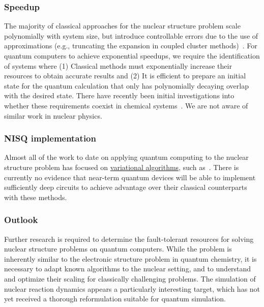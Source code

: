 \begin{refsection}

\subsubsection*{Speedup}
The majority of classical approaches for the nuclear structure problem scale polynomially with system size, but introduce controllable errors due to the use of approximations (e.g., truncating the expansion in coupled cluster methods)~\cite{hergert2020AbInitioNuclear}. For quantum computers to achieve exponential speedups, we require the identification of systems where (1) Classical methods must exponentially increase their resources to obtain accurate results and (2) It is efficient to prepare an initial state for the quantum calculation that only has polynomially decaying overlap with the desired state. There have recently been initial investigations into whether these requirements coexist in chemical systems~\cite{lee2022isThereEvidenceChemistry}. We are not aware of similar work in nuclear physics.



\subsubsection*{NISQ implementation}
Almost all of the work to date on applying quantum computing to the nuclear structure problem has focused on \hyperref[prim:VQA]{variational algorithms}, such as~\cite{dumitrescu2018CloudNucleus,lu2019NuclearQuantumFrequency,stetcu2022NuclearVariational}. There is currently no evidence that near-term quantum devices will be able to implement sufficiently deep circuits to achieve advantage over their classical counterparts with these methods.




\subsubsection*{Outlook}
Further research is required to determine the fault-tolerant resources for solving nuclear structure problems on quantum computers. While the problem is inherently similar to the electronic structure problem in quantum chemistry, it is necessary to adapt known algorithms to the nuclear setting, and to understand and optimize their scaling for classically challenging problems. The simulation of nuclear reaction dynamics appears a particularly interesting target, which has not yet received a thorough reformulation suitable for quantum simulation.



\printbibliography[heading=secbib,segment=\therefsegment]

\end{refsection}


